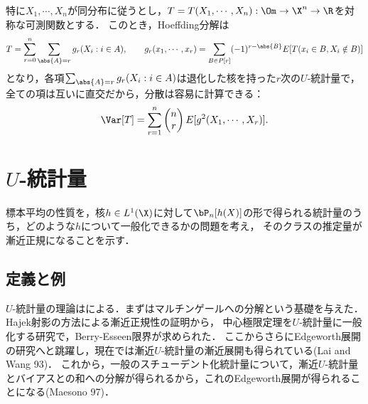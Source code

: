 \documentclass[uplatex,dvipdfmx]{jsreport}
\begin{document}
\begin{remarks}
    特に$X_1,\cdots,X_n$が同分布に従うとし，$T=T(X_1,\cdots,X_n):\Om\to\X^n\to\R$を対称な可測関数とする．
    このとき，Hoeffding分解は
    \[T=\sum^n_{r=0}\sum_{\abs{A}=r}g_r(X_i:i\in A),\qquad g_r(x_1,\cdots,x_r)=\sum_{B\in P[r]}(-1)^{r-\abs{B}}E[T(x_i\in B,X_i\notin B)]\]
    となり，各項$\sum_{\abs{A}=r}g_r(X_i:i\in A)$は退化した核を持った$r$次の$U$-統計量で，全ての項は互いに直交だから，分散は容易に計算できる：
    \[\Var[T]=\sum_{r=1}^n \begin{pmatrix}n\\r\end{pmatrix}E[g^2(X_1,\cdots,X_r)].\]
\end{remarks}

\section{$U$-統計量}

\begin{tcolorbox}[colframe=ForestGreen, colback=ForestGreen!10!white,breakable,colbacktitle=ForestGreen!40!white,coltitle=black,fonttitle=\bfseries\sffamily,
title=]
    標本平均の性質を，核$h\in L^1(\X)$に対して$\bP_n[h(X)]$の形で得られる統計量のうち，どのような$h$について一般化できるかの問題を考え，
    そのクラスの推定量が漸近正規になることを示す．
\end{tcolorbox}

\subsection{定義と例}

\begin{history}
    $U$-統計量の理論は\cite{Hoeffding48-U-statistic}による．まず\cite{Hoeffding61-SLLN}はマルチンゲールへの分解という基礎を与えた．
    Hajek射影の方法による漸近正規性の証明から，
    中心極限定理を$U$-統計量に一般化する研究で，Berry-Esseen限界が求められた．
    ここからさらにEdgeworth展開の研究へと跳躍し，現在では漸近$U$-統計量の漸近展開も得られている(Lai and Wang 93)．
    これから，一般のスチューデント化統計量について，漸近$U$-統計量とバイアスとの和への分解が得られるから，これのEdgeworth展開が得られることになる(Maesono 97)．
\end{history}
\end{document}
